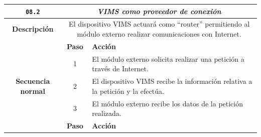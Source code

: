 \begin{table}[H]
  \centering
  \begin{tabularx}{\textwidth}{|c|c|X|}
    \hline
    \texttt{08.2}                               & \multicolumn{2}{c|}{\textit{\ac{VIMS} como proveedor de conexión}}                                                                                                                                                                                   \\
    \hline
    \textbf{Descripción}                        & \multicolumn{2}{X|}{El dispositivo \ac{VIMS} actuará como ``router'' permitiendo al módulo externo realizar comunicaciones con Internet.}                                                                                                            \\
    \hline
    \multirow{6}{*}{\textbf{Secuencia normal}} & \textbf{Paso}                                                                                                                             & \textbf{Acción}                                                                                          \\
    \cline{2-3}
                                                & 1                                                                                                                                         & \multicolumn{1}{L|}{El módulo externo solicita realizar una petición a través de Internet.}              \\
    \cline{2-3}
                                                & 2                                                                                                                                         & \multicolumn{1}{L|}{El dispositivo \ac{VIMS} recibe la información relativa a la petición y la efectúa.} \\
    \cline{2-3}
                                                & 3                                                                                                                                         & \multicolumn{1}{L|}{El módulo externo recibe los datos de la petición realizada.}                        \\
    \hline
    \multirow{6}{*}{\textbf{Excepciones}}       & \textbf{Paso}                                                                                                                             & \textbf{Acción}                                                                                          \\

\end{tabularx}
\end{table}
